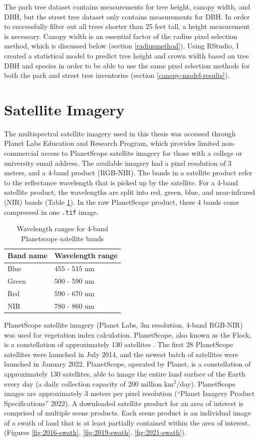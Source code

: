 \documentclass[12pt,twoside]{reedthesis}
\begin{document}
The park tree dataset contains measurements for tree height, canopy
width, and DBH, but the street tree dataset only contains measurements
for DBH. In order to successfully filter out all trees shorter than 25
feet tall, a height measurement is necessary. Canopy width is an
essential factor of the radius pixel selection method, which is
discussed below (section \ref{radiusmethod}). Using RStudio, I created
a statistical model to predict tree height and crown width based on tree
DBH and species in order to be able to use the same pixel selection
methods for both the park and street tree inventories (section
\ref{canopy-model-results}).

\hypertarget{satellite-imagery}{%
\section{Satellite Imagery}\label{satellite-imagery}}

The multispectral satellite imagery used in this thesis was accessed
through Planet Labs Education and Research Program, which provides
limited non-commercial access to PlanetScope satellite imagery for those
with a college or university email address. The available imagery had a
pixel resolution of 3 meters, and a 4-band product (RGB-NIR). The bands
in a satellite product refer to the reflectance wavelength that is
picked up by the satellite. For a 4-band satellite product, the
wavelengths are split into red, green, blue, and near-infrared (NIR)
bands (Table \ref{tab:wavelength}). In the raw PlanetScope product,
these 4 bands come compressed in one \texttt{.tif} image.
\begin{longtable}[t]{ll}
\caption[4-band satellite wavelength ranges]{\label{tab:wavelength}Wavelength ranges for 4-band Planetscope satellite bands}\\
\toprule
Band name & Wavelength range\\
\midrule
Blue & 455 - 515 nm\\
Green & 500 - 590 nm\\
Red & 590 - 670 nm\\
NIR & 780 - 860 nm\\
\bottomrule
\end{longtable}
PlanetScope satellite imagery (Planet Labs, 3m resolution, 4-band
RGB-NIR) was used for vegetation index calculation. PlanetScope, also
known as the Flock, is a constellation of approximately 130 satellites .
The first 28 PlanetScope satellites were launched in July 2014, and the
newest batch of satellites were launched in January 2022. PlanetScope,
operated by Planet, is a constellation of approximately 130 satellites,
able to image the entire land surface of the Earth every day (a daily
collection capacity of 200 million km\(^2\)/day). PlanetScope images are
approximately 3 meters per pixel resolution ({``Planet Imagery Product Specifications''} 2022). A
downloaded satellite product for an area of interest is comprised of
multiple scene products. Each scene product is an individual image of a
swath of land that is at least partially contained within the area of
interest. (Figures \ref{fig:2016-swath}, \ref{fig:2019-swath},
\ref{fig:2021-swath}).
\end{document}
